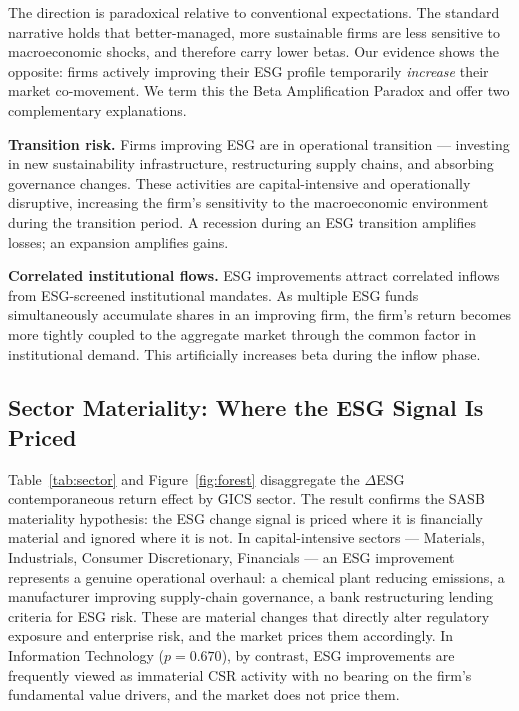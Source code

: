 The direction is paradoxical relative to conventional expectations. The standard narrative holds that better-managed, more sustainable firms are less sensitive to macroeconomic shocks, and therefore carry lower betas. Our evidence shows the opposite: firms actively improving their ESG profile temporarily \emph{increase} their market co-movement. We term this the Beta Amplification Paradox and offer two complementary explanations.

\textbf{Transition risk.} Firms improving ESG are in operational transition --- investing in new sustainability infrastructure, restructuring supply chains, and absorbing governance changes. These activities are capital-intensive and operationally disruptive, increasing the firm's sensitivity to the macroeconomic environment during the transition period. A recession during an ESG transition amplifies losses; an expansion amplifies gains.

\textbf{Correlated institutional flows.} ESG improvements attract correlated inflows from ESG-screened institutional mandates. As multiple ESG funds simultaneously accumulate shares in an improving firm, the firm's return becomes more tightly coupled to the aggregate market through the common factor in institutional demand. This artificially increases beta during the inflow phase.



\subsection*{Sector Materiality: Where the ESG Signal Is Priced}

Table~\ref{tab:sector} and Figure~\ref{fig:forest} disaggregate the $\Delta$ESG contemporaneous return effect by GICS sector. The result confirms the SASB materiality hypothesis: the ESG change signal is priced where it is financially material and ignored where it is not.
In capital-intensive sectors --- Materials, Industrials, Consumer Discretionary, Financials --- an ESG improvement represents a genuine operational overhaul: a chemical plant reducing emissions, a manufacturer improving supply-chain governance, a bank restructuring lending criteria for ESG risk. These are material changes that directly alter regulatory exposure and enterprise risk, and the market prices them accordingly. In Information Technology ($p = 0.670$), by contrast, ESG improvements are frequently viewed as immaterial CSR activity with no bearing on the firm's fundamental value drivers, and the market does not price them.

